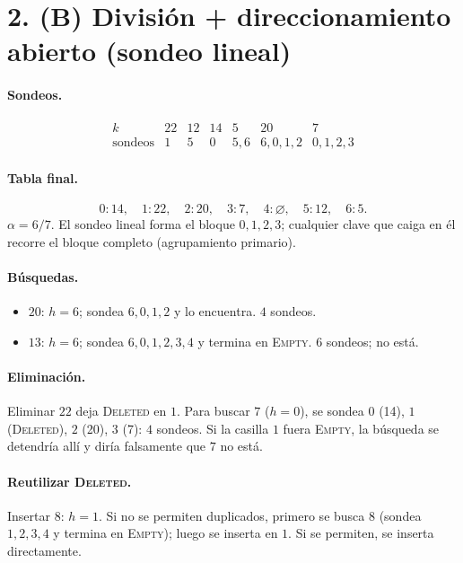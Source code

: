 \documentclass[11pt]{article}
\begin{document}
\section*{2. (B) División + direccionamiento abierto (sondeo lineal)}

\paragraph{Sondeos.}
\[
\begin{array}{c|cccccc}
k & 22 & 12 & 14 & 5 & 20 & 7\\ \hline
\text{sondeos} & 1 & 5 & 0 & 5,6 & 6,0,1,2 & 0,1,2,3
\end{array}
\]

\paragraph{Tabla final.}
\[
0:14,\quad 1:22,\quad 2:20,\quad 3:7,\quad 4:\varnothing,\quad 5:12,\quad 6:5.
\]
\(\alpha=6/7\). El sondeo lineal forma el bloque \(0,1,2,3\); cualquier clave que caiga en él recorre el bloque completo (agrupamiento primario).

\paragraph{Búsquedas.}
\begin{itemize}[itemsep=0.15em]
\item \(20\): \(h=6\); sondea \(6,0,1,2\) y lo encuentra. \(4\) sondeos.
\item \(13\): \(h=6\); sondea \(6,0,1,2,3,4\) y termina en \textsc{Empty}. \(6\) sondeos; no está.
\end{itemize}

\paragraph{Eliminación.}
Eliminar \(22\) deja \textsc{Deleted} en \(1\). Para buscar \(7\) (\(h=0\)), se sondea \(0\) (14), \(1\) (\textsc{Deleted}), \(2\) (20), \(3\) (7): \(4\) sondeos. Si la casilla \(1\) fuera \textsc{Empty}, la búsqueda se detendría allí y diría falsamente que \(7\) no está.

\paragraph{Reutilizar \textsc{Deleted}.}
Insertar \(8\): \(h=1\). Si no se permiten duplicados, primero se busca \(8\) (sondea \(1,2,3,4\) y termina en \textsc{Empty}); luego se inserta en \(1\). Si se permiten, se inserta directamente.
\end{document}
